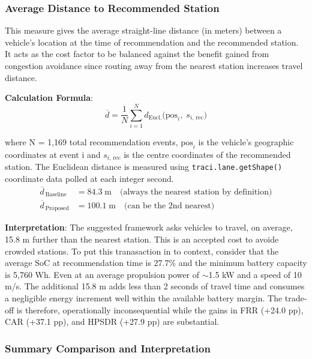 \documentclass[conference]{IEEEtran}
\begin{document}
\subsubsection{Average Distance to Recommended Station} This measure gives
the average straight-line distance (in meters) between a
vehicle’s location at the time of recommendation and the
recommended station. It acts as the cost factor to be
balanced against the benefit gained from congestion avoidance
since routing away from the nearest station increases
travel distance.


\textbf{Calculation Formula}:
\begin{equation}
  \overline{d} =
    \frac{1}{N}\sum_{i=1}^{N}
      d_{\text{Eucl.}}\!\bigl(\mathrm{pos}_{i},\;
                               s_{i,\,\text{rec}}\bigr)
  \label{eq:avgdist}
\end{equation}

where N = 1,169 total recommendation events, $\mathrm{pos}_{i}$ is the
vehicle's geographic coordinates at event i and
$s_{i,\,\text{rec}}$ is the centre coordinates of the recommended
station. The Euclidean distance is measured using
\texttt{traci.lane.getShape()} coordinate data polled at each integer
second.
\begin{align}
  \overline{d}_{\,\text{Baseline}} &= 84.3\;\text{m}
    \quad\text{(always the nearest station by definition)}
    \label{eq:dist_base}\\
  \overline{d}_{\,\text{Proposed}} &= 100.1\;\text{m}
    \quad\text{(can be the 2nd nearest)}
    \label{eq:dist_prop}
\end{align}

\textbf{Interpretation}: The suggested framework asks vehicles to travel,
on average, 15.8 m further than the nearest station. This is an
accepted cost to avoide crowded stations. To put this
tranasaction in to context, consider that the average SoC at recommendation time is
27.7\% and the minimum battery capacity is 5,760 Wh. Even at an average
propulsion power of ${\sim}$1.5 kW and a speed of 10 m/s. The
additional 15.8 m adds less than 2 seconds of travel time and consumes
a negligible energy increment well within the available battery margin.
The trade-off is therefore, operationally inconsequential while the gains
in FRR (+24.0 pp), CAR (+37.1 pp), and HPSDR (+27.9 pp) are
substantial.

\subsubsection{Summary Comparison and Interpretation}
\end{document}
